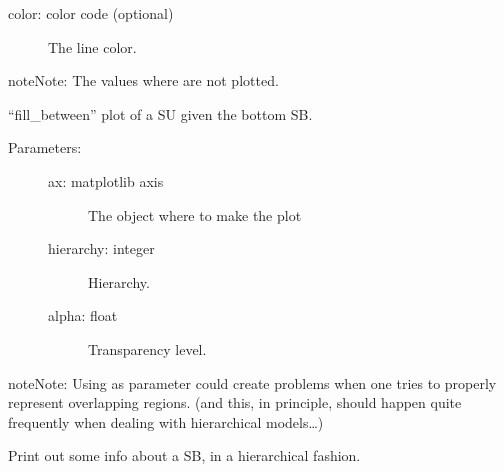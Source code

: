 \documentclass[letterpaper,10pt,english]{sphinxmanual}
\begin{document}
\begin{fulllineitems}
\begin{fulllineitems}
\begin{description}
\begin{description}
\item[{color: color code (optional)}] \leavevmode
The line color.

\end{description}

\end{description}

\begin{sphinxadmonition}{note}{Note:}
The values where  are not plotted.
\end{sphinxadmonition}

\end{fulllineitems}


\begin{fulllineitems}
\label{\detokenize{hiegeo:hiegeo.SBound.plot_fill}}
“fill\_between” plot of a SU given the bottom SB.
\begin{description}
\item[{Parameters:}] \leavevmode\begin{description}
\item[{ax: matplotlib axis}] \leavevmode
The object where to make the plot

\item[{hierarchy: integer}] \leavevmode
Hierarchy.

\item[{alpha: float}] \leavevmode
Transparency level.

\end{description}

\end{description}

\begin{sphinxadmonition}{note}{Note:}
Using  as parameter could create problems when one 
tries to properly represent overlapping regions.
(and this, in principle, should happen quite frequently when
dealing with hierarchical models…)
\end{sphinxadmonition}

\end{fulllineitems}


\begin{fulllineitems}
\label{\detokenize{hiegeo:hiegeo.SBound.print_hie}}
Print out some info about a SB, in a hierarchical fashion.

\end{fulllineitems}


\end{fulllineitems}
\end{document}
